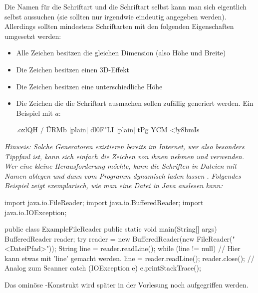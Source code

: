 \documentclass[table]{sopra-base}
\begin{document}
Die Namen für die Schriftart und die Schriftart selbst kann man sich eigentlich selbst aussuchen (sie sollten nur irgendwie eindeutig
angegeben werden). Allerdings sollten mindestens Schriftarten mit den folgenden Eigenschaften umgesetzt werden:
\begin{itemize}[nolistsep]
    \item Alle Zeichen besitzen die gleichen Dimension (also Höhe und Breite)
    \item Die Zeichen besitzen einen 3D-Effekt
    \item Die Zeichen besitzen eine unterschiedliche Höhe
    \item Die Zeichen die die Schriftart ausmachen sollen zufällig generiert werden. Ein Beispiel mit $a$:
\begin{plainjava}
 .oxlQH   
/   ÜRMb  
|plain| dl0F"LI  |plain|
tPg  YCM  
 <!y8bmIs 
\end{plainjava}
\end{itemize} 
\textit{Hinweis: Solche Generatoren existieren bereits im Internet, wer also besonders Tippfaul ist, kann sich einfach die Zeichen von ihnen nehmen und verwenden. Wer eine kleine Herausforderung möchte, kann die Schriften in Dateien mit Namen  ablegen und dann vom Programm dynamisch laden lassen \Winkey. Folgendes Beispiel zeigt exemplarisch, wie man eine Datei in Java auslesen kann:}
\begin{java}
import java.io.FileReader;
import java.io.BufferedReader;
import java.io.IOException;

public class ExampleFileReader {
    public static void main(String[] args) {
        BufferedReader reader;
        try {
            reader = new BufferedReader(new FileReader("<DateiPfad>"));
            String line = reader.readLine();
            while (line != null) {
                // Hier kann etwas mit 'line' gemacht werden.
                line = reader.readLine();
            }
            reader.close(); // Analog zum Scanner
        } catch (IOException e) {
            e.printStackTrace();
        }
    }
}
\end{java}
Das ominöse -Konstrukt wird später in der Vorlesung noch aufgegriffen werden.
\end{document}
